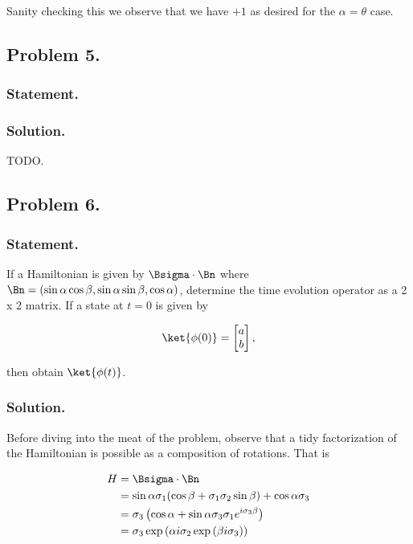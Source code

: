 Sanity checking this we observe that we have $+1$ as desired for the $\alpha = \theta$ case.

\subsection{Problem 5.}
\subsubsection{Statement.}
\subsubsection{Solution.}

TODO.

\subsection{Problem 6.}
\subsubsection{Statement.}

If a Hamiltonian is given by $\Bsigma \cdot \Bn$ where $\Bn = (\sin\alpha\cos\beta, \sin\alpha\sin\beta, \cos\alpha)$, determine the time evolution operator as a 2 x 2 matrix.  If a state at $t = 0$ is given by 

\begin{align}\label{eqn:desaiCh5:600}
\ket{\phi(0)} = 
\begin{bmatrix}
a \\
b
\end{bmatrix},
\end{align}

then obtain $\ket{\phi(t)}$.

\subsubsection{Solution.}

Before diving into the meat of the problem, observe that a tidy factorization of the Hamiltonian is possible as a composition of rotations.  That is

\begin{align*}
H 
&= \Bsigma \cdot \Bn \\
&= \sin\alpha \sigma_1 ( \cos\beta + \sigma_1 \sigma_2 \sin\beta ) + \cos\alpha \sigma_3 \\
&= \sigma_3 \left(
\cos\alpha 
+ \sin\alpha \sigma_3 \sigma_1 e^{ i \sigma_3 \beta }
\right) \\
&= 
\sigma_3 \exp\left( \alpha i \sigma_2 
\exp\left( \beta i \sigma_3 
\right)
\right)
\end{align*}

